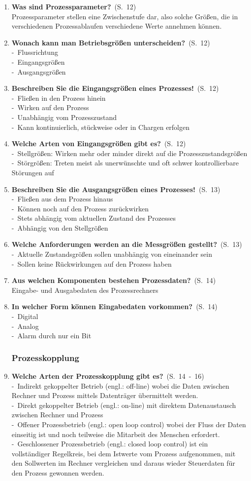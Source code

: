 \documentclass[a4paper,12pt]{article}
\newcommand{\question}[3]{\pagebreak[3]\item {\textbf{#1?}}\ (S.\ #2)#3}
\newcommand{\statement}[3]{\pagebreak[3]\item {\textbf{#1!}}\ (S.\ #2)#3}
\newcommand{\catchword}[1]{\\-\ #1}
\newcommand{\normaltext}[1]{\\#1}
\newcommand{\page}[1]{#1}
\newcommand{\pages}[2]{#1\ -\ #2}
\begin{document}
\begin{enumerate}
  \question{Was sind Prozessparameter}{\page{12}}
  {
    \normaltext{Prozessparameter stellen eine Zwischenstufe dar, also solche Größen, die in verschiedenen
                Prozessablaufen verschiedene Werte annehmen können.}
  }

  \question{Wonach kann man Betriebsgrößen unterscheiden}{\page{12}}
  {
    \catchword{Flussrichtung}
    \catchword{Eingangsgrößen}
    \catchword{Ausgangsgrößen}
  }

  \statement{Beschreiben Sie die Eingangsgrößen eines Prozesses}{\page{12}}
  {
    \catchword{Fließen in den Prozess hinein}
    \catchword{Wirken auf den Prozess}
    \catchword{Unabhängig vom Prozesszustand}
    \catchword{Kann kontinuierlich, stückweise oder in Chargen erfolgen}
  }

  \question{Welche Arten von Eingangsgrößen gibt es}{\page{12}}
  {
    \catchword{Stellgrößen: Wirken mehr oder minder direkt auf die Prozesszustandsgrößen}
    \catchword{Störgrößen: Treten meist als unerwünschte und oft schwer kontrollierbare Störungen auf}
  }

  \statement{Beschreiben Sie die Ausgangsgrößen eines Prozesses}{\page{13}}
  {
    \catchword{Fließen aus dem Prozess hinaus}
    \catchword{Können noch auf den Prozess zurückwirken}
    \catchword{Stets abhängig vom aktuellen Zustand des Prozesses}
    \catchword{Abhängig von den Stellgrößen}
  }

  \question{Welche Anforderungen werden an die Messgrößen gestellt}{\page{13}}
  {
    \catchword{Aktuelle Zustandsgrößen sollen unabhängig von eineinander sein}
    \catchword{Sollen keine Rückwirkungen auf den Prozess haben}
  }

  \question{Aus welchen Komponenten bestehen Prozessdaten}{\page{14}}
  {
    \normaltext{Eingabe- und Ausgabedaten des Prozessrechners}
  }

  \question{In welcher Form können Eingabedaten vorkommen}{\page{14}}
  {
    \catchword{Digital}
    \catchword{Analog}
    \catchword{Alarm durch nur ein Bit}
  }

  \subsubsection{Prozesskopplung}

  \question{Welche Arten der Prozesskopplung gibt es}{\pages{14}{16}}
  {
    \catchword{Indirekt gekoppelter Betrieb (engl.: off-line) wobei die Daten zwischen Rechner und Prozess
               mittels Datenträger übermittelt werden.}
    \catchword{Direkt gekoppelter Betrieb (engl.: on-line) mit direktem Datenaustausch
               zwischen Rechner und Prozess}
    \catchword{Offener Prozessbetrieb (engl.: open loop control) wobei der Fluss der Daten
               einseitig ist und noch teilweise die Mitarbeit des Menschen erfordert.}
    \catchword{Geschlossener Prozessbetrieb (engl.: closed loop control) ist ein vollständiger
               Regelkreis, bei dem Istwerte vom Prozess aufgenommen, mit den Sollwerten im
               Rechner vergleichen und daraus wieder Steuerdaten für den Prozess gewonnen werden.}
  }


\end{enumerate}
\end{document}
